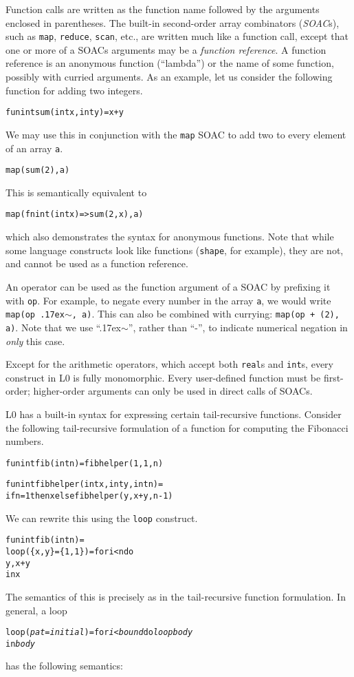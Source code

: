 \documentclass[oneside]{memoir}
\newcommand\realt[0]{\texttt{real}}
\newcommand\intt[0]{\texttt{int}}
\renewcommand\tilde[0]{{\raise.17ex\hbox{$\scriptstyle\sim$}}}
\begin{document}
Function calls are written as the function name followed by the
arguments enclosed in parentheses.  The built-in second-order array
combinators (\emph{SOAC}s), such as \texttt{map}, \texttt{reduce}, \texttt{scan}, etc., 
are written much like a function call,
except that one or more of a SOACs arguments may be a \emph{function
  reference}.  A function reference is an anonymous function
(``lambda'') or the name of some function, possibly with curried
arguments.  As an example, let us consider the following function for
adding two integers.
\begin{alltt}
fun int sum(int x, int y) = x + y
\end{alltt}
We may use this in conjunction with the \texttt{map} SOAC to add two
to every element of an array \texttt{a}.
\begin{alltt}
map(sum (2), a)
\end{alltt}
This is semantically equivalent to
\begin{alltt}
map(fn int (int x) => sum(2, x), a)
\end{alltt}
which also demonstrates the syntax for anonymous functions.  Note that
while some language constructs look like functions (\texttt{shape}, for
example), they are not, and cannot be used as a function reference.

An operator can be used as the function argument of a SOAC by
prefixing it with \texttt{op}.  For example, to negate every number in
the array \texttt{a}, we would write \texttt{map(op \tilde{}, a)}.
This can also be combined with currying: \texttt{map(op + (2), a)}.
Note that we use ``\tilde{}'', rather than ``-'', to indicate
numerical negation in \textit{only} this case.

Except for the arithmetic operators, which accept both \realt{}s
and \intt{}s, every construct in L0 is fully monomorphic.  Every
user-defined function must be first-order; higher-order arguments can
only be used in direct calls of SOACs.

L0 has a built-in syntax for expressing certain tail-recursive
functions.  Consider the following tail-recursive formulation of a
function for computing the Fibonacci numbers.
\begin{alltt}
  fun int fib(int n) = fibhelper(1,1,n)

  fun int fibhelper(int x, int y, int n) =
    if n = 1 then x else fibhelper(y, x+y, n-1)
\end{alltt}
We can rewrite this using the \texttt{loop} construct.
\begin{alltt}
  fun int fib(int n) =
    loop (\{x, y\} = \{1,1\}) = for i < n do
                              {y, x+y}
    in x
\end{alltt}
The semantics of this is precisely as in the tail-recursive function
formulation.  In general, a loop
\begin{alltt}
  loop (\emph{pat} = \emph{initial}) = for \emph{i} < \emph{bound} do \emph{loopbody}
  in \emph{body}
\end{alltt}
has the following semantics:
\end{document}
